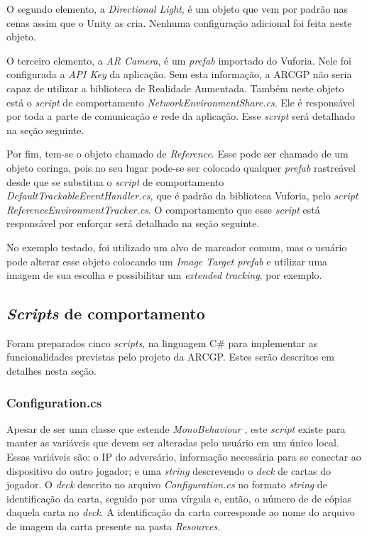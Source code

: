 \documentclass[conference]{IEEEtran}
\begin{document}
O segundo elemento, a \textit{Directional Light}, é um objeto que vem por padrão 
nas cenas assim que o Unity as cria. Nenhuma configuração adicional foi feita 
neste objeto.

O terceiro elemento, a \textit{AR Camera}, é um \textit{prefab} importado do 
Vuforia. Nele foi configurada a \textit{API Key} da aplicação. Sem esta 
informação, a ARCGP não seria capaz de utilizar a biblioteca de Realidade 
Aumentada. Também neste objeto está o \textit{script} de comportamento \textit{
NetworkEnvironmentShare.cs}. Ele é responsável por toda a parte de comunicação 
e rede da aplicação. Esse \textit{script} será detalhado na seção seguinte.

Por fim, tem-se o objeto chamado de \textit{Reference}. Esse pode ser chamado de 
um objeto coringa, pois no seu lugar pode-se ser colocado qualquer \textit{
prefab} rastreável desde que se substitua o \textit{script} de comportamento 
\textit{DefaultTrackableEventHandler.cs}, que é padrão da biblioteca Vuforia, 
pelo \textit{script ReferenceEnvironmentTracker.cs}. O comportamento que esse 
\textit{script} está responsável por enforçar será detalhado na seção seguinte.

No exemplo testado, foi utilizado um alvo de marcador comum, mas o usuário pode 
alterar esse objeto colocando um \textit{Image Target prefab} e utilizar uma 
imagem de sua escolha e possibilitar um \textit{extended tracking}, por exemplo.

\subsection{\textit{Scripts} de comportamento}
\label{scripts}
Foram preparados cinco \textit{scripts}, na linguagem C\# para implementar as 
funcionalidades previstas pelo projeto da ARCGP. Estes serão descritos em 
detalhes nesta seção.

\subsubsection{Configuration.cs}
\label{config}
Apesar de ser uma classe que estende \textit{MonoBehaviour} \cite{mono}, este 
\textit{script} existe para manter as variáveis que devem ser alteradas pelo 
usuário em um único local. Essas variáveis são: o IP do adversário, informação 
necessária para se conectar ao dispositivo do outro jogador; e uma 
\textit{string} descrevendo o \textit{deck} de cartas do jogador. O 
\textit{deck} descrito no arquivo \textit{Configuration.cs} no formato 
\textit{string} de identificação da carta, seguido por uma vírgula e, então, o 
número de de cópias daquela carta no \textit{deck}. A identificação da carta 
corresponde ao nome do arquivo de imagem da carta presente na pasta 
\textit{Resources}.
\end{document}
